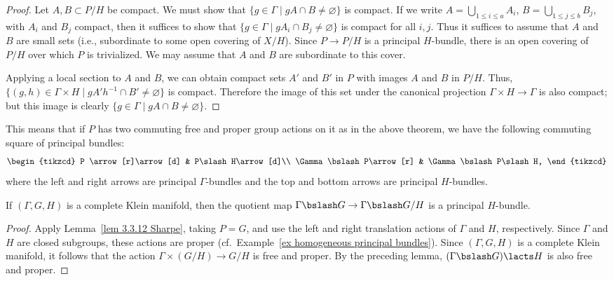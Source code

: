 \begin{proof}
    Let $A,B\subset P\slash H$ be compact. We must show that $\{g\in\Gamma\mid gA\cap B\neq \varnothing\}$ is compact. If we write $A=\bigcup_{1\leq i\leq a}A_i$, $B=\bigcup_{1\leq j\leq b}B_j$, with $A_i$ and $B_j$ compact, then it suffices to show that $\{g\in\Gamma\mid gA_i\cap B_j\neq\varnothing\}$ is compact for all $i,j$. Thus it suffices to assume that $A$ and $B$ are small sets (i.e., subordinate to some open covering of $X\slash H$). Since $P\to P\slash H$ is a principal $H$-bundle, there is an open covering of $P\slash H$ over which $P$ is trivialized. We may assume that $A$ and $B$ are subordinate to this cover.

    Applying a local section to $A$ and $B$, we can obtain compact sets $A'$ and $B'$ in $P$ with images $A$ and $B$ in $P\slash H$. Thus, $\{(g,h)\in\Gamma\times H\mid gA' h^{-1}\cap B'\neq \varnothing\}$ is compact. Therefore the image of this set under the canonical projection $\Gamma\times H\to \Gamma$ is also compact; but this image is clearly $\{g\in\Gamma\mid gA\cap B\neq \varnothing\}$.
\end{proof}


This means that if $P$ has two commuting free and proper group actions on it as in the above theorem, we have the following commuting square of principal bundles:
\[\begin{tikzcd}
    P \arrow[r]\arrow[d] & P\slash H\arrow[d]\\
    \Gamma\bslash P\arrow[r] & \Gamma\bslash P\slash H,
\end{tikzcd}\]
where the left and right arrows are principal $\Gamma$-bundles and the top and bottom arrows are principal $H$-bundles.


\begin{cor}
    If $(\Gamma,G,H)$ is a complete Klein manifold, then the quotient map $\Gamma\bslash G\to \Gamma\bslash G\slash H$ is a principal $H$-bundle.
\end{cor}
\begin{proof}
    Apply Lemma~\ref{lem 3.3.12 Sharpe}, taking $P=G$, and use the left and right translation actions of $\Gamma$ and $H$, respectively. Since $\Gamma$ and $H$ are closed subgroups, these actions are proper (cf.\ Example~\ref{ex homogeneous principal bundles}). Since $(\Gamma,G,H)$ is a complete Klein manifold, it follows that the action $\Gamma\times(G\slash H)\to G\slash H$ is free and proper. By the preceding lemma, $(\Gamma\bslash G)\lacts H$ is also free and proper.
\end{proof}

